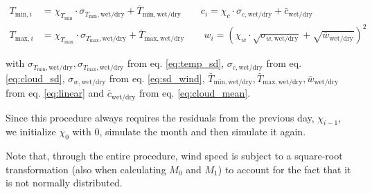 \begin{refsection}
\begin{align}
T_{\mathrm{min},i} &= \chi_{T_\mathrm{min}} \cdot \sigma_{T_\mathrm{min},\mathrm{wet/dry}} + \bar{T}_{\mathrm{min}, \mathrm{wet/dry}} \qquad c_{i} = \chi_{c} \cdot \sigma_{c,\mathrm{wet/dry}} + \bar{c}_{\mathrm{wet/dry}} \\
T_{\mathrm{max},i} &= \chi_{T_\mathrm{max}} \cdot \sigma_{T_\mathrm{max},\mathrm{wet/dry}} + \bar{T}_{\mathrm{max}, \mathrm{wet/dry}} \qquad w_{i} = \left(\chi_{w} \cdot \sqrt{\sigma_{w,\mathrm{wet/dry}}} + \sqrt{\bar{w}_\mathrm{wet/dry}}\right)^2
\end{align}

with $\sigma_{T_\mathrm{min},\mathrm{wet/dry}}, \sigma_{T_\mathrm{max},\mathrm{wet/dry}}$ from eq. \eqref{eq:temp_sd}, $\sigma_{c,\mathrm{wet/dry}}$ from eq. \eqref{eq:cloud_sd}, $\sigma_{w,\mathrm{wet/dry}}$ from eq. \eqref{eq:sd_wind}, $\bar{T}_{\mathrm{min}, \mathrm{wet/dry}}, \bar{T}_{\mathrm{max}, \mathrm{wet/dry}}, \bar{w}_\mathrm{wet/dry}$ from eq. \eqref{eq:linear} and $\bar{c}_{\mathrm{wet/dry}}$ from eq. \eqref{eq:cloud_mean}.

Since this procedure always requires the residuals from the previous day, $\chi_{i-1}$, we initialize $\chi_0$ with 0, simulate the month and then simulate it again.

Note that, through the entire procedure, wind speed is subject to a square-root transformation (also when calculating $M_0$ and $M_1$) to account for the fact that it is not normally distributed.


\end{refsection}
